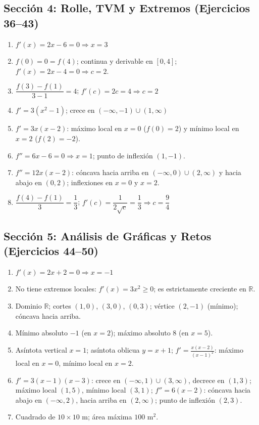 \documentclass[12pt, letterpaper]{article}
\begin{document}
  \subsection*{Sección 4: Rolle, TVM y Extremos (Ejercicios 36--43)}
  \begin{enumerate}[resume=respuestas, leftmargin=*, label=\textbf{\arabic*.}]
    \item $f'(x) = 2x - 6 = 0 \Rightarrow x = 3$
    \item $f(0) = 0 = f(4)$; continua y derivable en $[0, 4]$; $f'(x) = 2x - 4 = 0 \Rightarrow c = 2$.
    \item $\dfrac{f(3) - f(1)}{3 - 1} = 4$; $f'(c) = 2c = 4 \Rightarrow c = 2$
    \item $f' = 3(x^2 - 1)$; crece en $(-\infty, -1) \cup (1, \infty)$
    \item $f' = 3x(x - 2)$: máximo local en $x = 0$ ($f(0) = 2$) y mínimo local en $x = 2$ ($f(2) = -2$).
    \item $f'' = 6x - 6 = 0 \Rightarrow x = 1$; punto de inflexión $(1, -1)$.
    \item $f'' = 12x(x - 2)$: cóncava hacia arriba en $(-\infty, 0) \cup (2, \infty)$ y hacia abajo en $(0, 2)$; inflexiones en $x = 0$ y $x = 2$.
    \item $\dfrac{f(4) - f(1)}{3} = \dfrac{1}{3}$; $f'(c) = \dfrac{1}{2\sqrt{c}} = \dfrac{1}{3} \Rightarrow c = \dfrac{9}{4}$
  \end{enumerate}

  \subsection*{Sección 5: Análisis de Gráficas y Retos (Ejercicios 44--50)}
  \begin{enumerate}[resume=respuestas, leftmargin=*, label=\textbf{\arabic*.}]
    \item $f'(x) = 2x + 2 = 0 \Rightarrow x = -1$
    \item No tiene extremos locales: $f'(x) = 3x^2 \ge 0$; es estrictamente creciente en $\mathbb{R}$.
    \item Dominio $\mathbb{R}$; cortes $(1, 0)$, $(3, 0)$, $(0, 3)$; vértice $(2, -1)$ (mínimo); cóncava hacia arriba.
    \item Mínimo absoluto $-1$ (en $x = 2$); máximo absoluto $8$ (en $x = 5$).
    \item Asíntota vertical $x = 1$; asíntota oblicua $y = x + 1$; $f' = \frac{x(x - 2)}{(x - 1)^2}$: máximo local en $x = 0$, mínimo local en $x = 2$.
    \item $f' = 3(x - 1)(x - 3)$: crece en $(-\infty, 1) \cup (3, \infty)$, decrece en $(1, 3)$; máximo local $(1, 5)$, mínimo local $(3, 1)$; $f'' = 6(x - 2)$: cóncava hacia abajo en $(-\infty, 2)$, hacia arriba en $(2, \infty)$; punto de inflexión $(2, 3)$.
    \item Cuadrado de $10 \times 10$ m; área máxima $100$ m$^2$.
  \end{enumerate}
\fi
\end{document}
